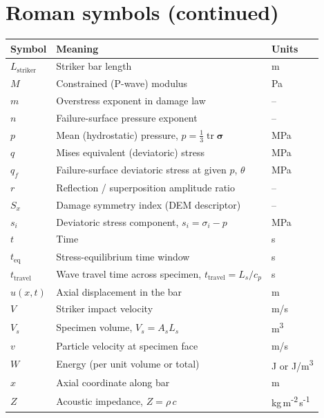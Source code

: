 \documentclass[11pt,a4paper,openany]{book}
\theoremstyle{handbook}
\newcommand{\sig}{\sigma}
\newcommand{\As}{A_s}
\newcommand{\Ls}{L_s}
\DeclareMathOperator{\tr}{tr}
\begin{document}
\clearpage
\section*{Roman symbols (continued)}
\begingroup
\setlength{\parskip}{0pt}
\begin{tabular}{@{}p{3.2cm}p{10cm}p{2cm}@{}}
\toprule
\textbf{Symbol} & \textbf{Meaning} & \textbf{Units} \\
\midrule
$L_{\text{striker}}$ & Striker bar length & m \\
$M$ & Constrained (P-wave) modulus & Pa \\
$m$ & Overstress exponent in damage law & -- \\
$n$ & Failure-surface pressure exponent & -- \\
$p$ & Mean (hydrostatic) pressure, $p=\tfrac{1}{3}\tr\bm\sig$ & MPa \\
$q$ & Mises equivalent (deviatoric) stress & MPa \\
$q_f$ & Failure-surface deviatoric stress at given $p$, $\theta$ & MPa \\
$r$ & Reflection / superposition amplitude ratio & -- \\
$S_x$ & Damage symmetry index (DEM descriptor) & -- \\
$s_i$ & Deviatoric stress component, $s_i=\sig_i-p$ & MPa \\
$t$ & Time & s \\
$t_{\text{eq}}$ & Stress-equilibrium time window & s \\
$t_{\text{travel}}$ & Wave travel time across specimen, $t_{\text{travel}}=\Ls/c_p$ & s \\
$u(x,t)$ & Axial displacement in the bar & m \\
$V$ & Striker impact velocity & m/s \\
$V_s$ & Specimen volume, $V_s=\As\Ls$ & m\textsuperscript{3} \\
$v$ & Particle velocity at specimen face & m/s \\
$W$ & Energy (per unit volume or total) & J or J/m\textsuperscript{3} \\
$x$ & Axial coordinate along bar & m \\
$Z$ & Acoustic impedance, $Z=\rho\,c$ & kg\,m\textsuperscript{-2}\,s\textsuperscript{-1} \\
\bottomrule
\end{tabular}
\endgroup
\end{document}
